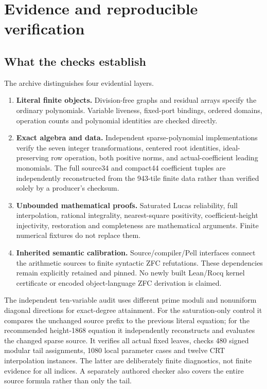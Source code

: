 \section{Evidence and reproducible verification}
\subsection{What the checks establish}
The archive distinguishes four evidential layers.
\begin{enumerate}
\item \textbf{Literal finite objects.} Division-free graphs and residual
arrays specify the ordinary polynomials. Variable liveness, fixed-port
bindings, ordered domains, operation counts and polynomial identities are
checked directly.
\item \textbf{Exact algebra and data.} Independent sparse-polynomial
implementations verify the seven integer transformations, centered root
identities, ideal-preserving row operation, both positive norms, and
actual-coefficient leading monomials. The full source34 and compact44
coefficient tuples are independently reconstructed from the 943-tile
finite data rather than verified solely by a producer's checksum.
\item \textbf{Unbounded mathematical proofs.} Saturated Lucas reliability,
full interpolation, rational integrality, nearest-square positivity,
coefficient-height injectivity, restoration and completeness are
mathematical arguments. Finite numerical fixtures do not replace them.
\item \textbf{Inherited semantic calibration.} Source/compiler/Pell
interfaces connect the arithmetic sources to finite syntactic ZFC
refutations. These dependencies remain explicitly retained and pinned.
No newly built Lean/Rocq kernel certificate or encoded object-language
ZFC derivation is claimed.
\end{enumerate}

The independent ten-variable audit uses different prime moduli and
nonuniform diagonal directions for exact-degree attainment. For the saturation-only control it compares
the unchanged source prefix to the previous literal equation; for the
recommended height-1868 equation it independently reconstructs and evaluates
the changed sparse source. It verifies
all actual fixed leaves, checks 480 signed modular tail assignments,
1080 local parameter cases and twelve CRT interpolation instances.
The latter are deliberately finite diagnostics, not finite evidence for
all indices. A separately authored checker also covers the entire source
formula rather than only the tail.

